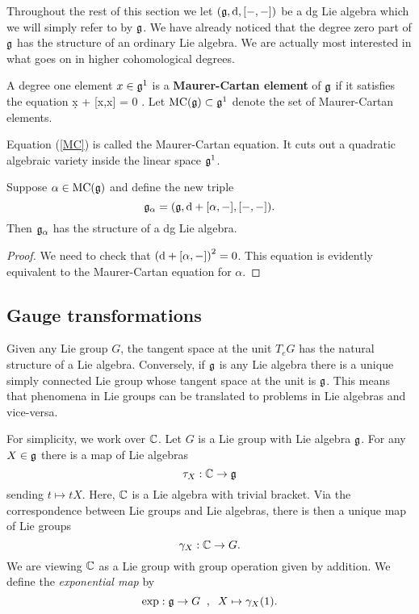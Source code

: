 \documentclass[11pt]{amsart}
\begin{document}
Throughout the rest of this section we let $(\mathfrak g, {\rm d}, [-,-])$ be a dg Lie algebra which we will simply refer to by $\mathfrak g$.
We have already noticed that the degree zero part of $\mathfrak g$ has the structure of an ordinary Lie algebra.
We are actually most interested in what goes on in higher cohomological degrees. 

\begin{dfn}
A degree one element $x \in \mathfrak g^1$ is a {\bf Maurer-Cartan element} of $\mathfrak g$ if it satisfies the equation
\beqn\label{MC}
\d x +  [x,x] = 0 .
\eeqn
Let ${\rm MC} (\mathfrak g) \subset \mathfrak g^1$ denote the set of Maurer-Cartan elements. 
\end{dfn}

Equation (\ref{MC}) is called the Maurer-Cartan equation.  
It cuts out a quadratic algebraic variety inside the linear space $\mathfrak g^1$. 

\begin{lem}\label{lem: easy}
Suppose $\alpha \in {\rm MC}(\mathfrak g)$ and define the new triple
\[
\mathfrak g_\alpha = (\mathfrak g, {\rm d} + [\alpha,-], [-,-]) .
\]
Then $\mathfrak g_{\alpha}$ has the structure of a dg Lie algebra. 
\end{lem}
\begin{proof}
We need to check that $\left({\rm d} + [\alpha,-]\right)^2 = 0$. 
This equation is evidently equivalent to the Maurer-Cartan equation for $\alpha$. 
\end{proof}

\subsection{Gauge transformations}

Given any Lie group $G$, the tangent space at the unit $T_e G$ has the natural structure of a Lie algebra. 
Conversely, if $\mathfrak g$ is any Lie algebra there is a unique simply connected Lie group whose tangent space at the unit is $\mathfrak g$. 
This means that phenomena in Lie groups can be translated to problems in Lie algebras and vice-versa. 

For simplicity, we work over $\mathbb C$. 
Let $G$ is a Lie group with Lie algebra $\mathfrak g$. 
For any $X \in \mathfrak g$ there is a map of Lie algebras
\[
\tau_X : \mathbb C \to \mathfrak g
\]
sending $t \mapsto t X$. 
Here, $\mathbb C$ is a Lie algebra with trivial bracket. 
Via the correspondence between Lie groups and Lie algebras, there is then a unique map of Lie groups
\[
\gamma_X : \mathbb C \to G .
\]
We are viewing $\mathbb C$ as a Lie group with group operation given by addition. 
We define the {\em exponential map} by
\[
\exp : \mathfrak g \to G \;\; , \;\; X \mapsto \gamma_X(1) .
\] 
\end{document}
